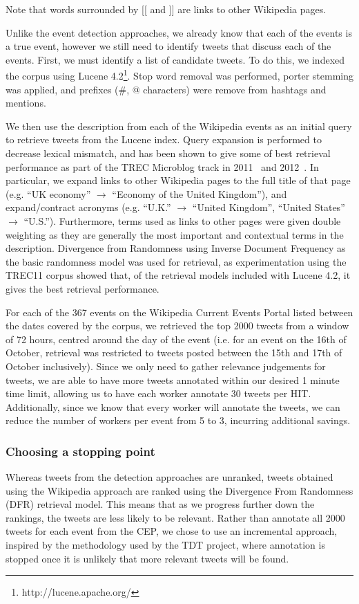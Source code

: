Note that words surrounded by [[ and ]] are links to other Wikipedia pages.

Unlike the event detection approaches, we already know that each of the events is a true event, however we still need to identify tweets that discuss each of the events.
First, we must identify a list of candidate tweets.
To do this, we indexed the corpus using Lucene 4.2\footnote{http://lucene.apache.org/}.
Stop word removal was performed, porter stemming was applied, and prefixes (\#, @ characters) were remove from hashtags and mentions.

We then use the description from each of the Wikipedia events as an initial query to retrieve tweets from the Lucene index.
Query expansion is performed to decrease lexical mismatch, and has been shown to give some of best retrieval performance as part of the TREC Microblog track in 2011~\citep{gambosi2011fub,ferguson2011clarity,li2011pris} and 2012~\citep{kimovercoming,younosFreq,hanhit}.
In particular, we expand links to other Wikipedia pages to the full title of that page (e.g. ``UK economy'' \(\to\) ``Economy of the United Kingdom''), and expand/contract acronyms (e.g. ``U.K.'' \(\to\) ``United Kingdom'', ``United States'' \(\to\) ``U.S.'').
Furthermore, terms used as links to other pages were given double weighting as they are generally the most important and contextual terms in the description.
Divergence from Randomness using Inverse Document Frequency as the basic randomness model was used for retrieval, as experimentation using the TREC11 corpus showed that, of the retrieval models included with Lucene 4.2, it gives the best retrieval performance.

For each of the 367 events on the Wikipedia Current Events Portal listed between the dates covered by the corpus, we retrieved the top 2000 tweets from a window of 72 hours, centred around the day of the event (i.e. for an event on the 16th of October, retrieval was restricted to tweets posted between the 15th and 17th of October inclusively).
Since we only need to gather relevance judgements for tweets, we are able to have more tweets annotated within our desired 1 minute time limit, allowing us to have each worker annotate 30 tweets per HIT.
Additionally, since we know that every worker will annotate the tweets, we can reduce the number of workers per event from 5 to 3, incurring additional savings.

\subsubsection{Choosing a stopping point}
Whereas tweets from the detection approaches are unranked, tweets obtained using the Wikipedia approach are ranked using the Divergence From Randomness (DFR) \citep{Amati02} retrieval model.
This means that as we progress further down the rankings, the tweets are less likely to be relevant.
Rather than annotate all 2000 tweets for each event from the CEP, we chose to use an incremental approach, inspired by the methodology used by the TDT project, where annotation is stopped once it is unlikely that more relevant tweets will be found.

